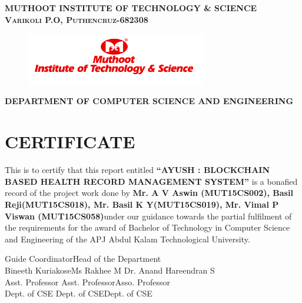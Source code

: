\documentclass[11pt]{report}
\begin{document}
\newpage\begin{titlepage}
\center

\textsc{ \textbf{MUTHOOT INSTITUTE OF TECHNOLOGY \& SCIENCE}}\\
\textsc{\textbf{Varikoli P.O, Puthencruz-682308}}
\vspace{0.7cm}
\begin{figure}[H]
\centering
\includegraphics[width=0.7\textwidth]{logo1.png}\\

\end{figure}
\vspace{0.2cm}
\textsc{ \small \textbf{ DEPARTMENT OF COMPUTER SCIENCE AND ENGINEERING}}\\




\section*{\centering CERTIFICATE}
\begin{center}
 This is to certify that this report entitled \textbf{``AYUSH : BLOCKCHAIN BASED HEALTH RECORD MANAGEMENT SYSTEM''} is a bonafied record
of the project work done by \textbf{Mr. A V Aswin (MUT15CS002), Basil Reji(MUT15CS018), Mr. Basil K Y(MUT15CS019), Mr. Vimal P Viswan (MUT15CS058)}under our guidance towards the partial fulfilment of the requirements for the award of Bachelor of Technology in Computer Science and
Engineering of the APJ Abdul Kalam Technological University.
\end{center}
\vspace{1.6cm}

\noindent Guide \hspace{3.5cm} Coordinator\hfill Head of the Department
\\
\noindent Bineeth Kuriakose\hspace{1.62cm}Ms Rakhee M \hfill Dr. Anand Hareendran S\\
\noindent Asst. Professor\hspace{2.05cm} Asst. Professor\hfill Asso. Professor\\
\noindent Dept. of CSE\hspace{2.3cm} Dept. of CSE\hfill Dept. of CSE

\end{titlepage}
\end{document}
